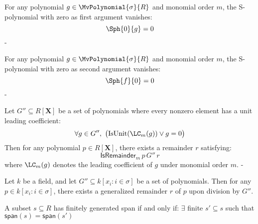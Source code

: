 \begin{lemma}\label{sPolynomial_eq_zero_of_left_eq_zero}
  \leanok
  For any polynomial $g \in \MvPolynomial{\sigma}{R}$ and monomial order $m$,
the S-polynomial with zero as first argument vanishes:
\[
\Sph{0}{g} = 0
\]
-
\end{lemma}

\begin{lemma}\label{sPolynomial_eq_zero_of_right_eq_zero'}
  \leanok
  For any polynomial $g \in \MvPolynomial{\sigma}{R}$ and monomial order $m$,
the S-polynomial with zero as second argument vanishes:
\[
\Sph{f}{0} = 0
\]
-
\end{lemma}

\begin{lemma}\label{div_set'}
  \leanok
  Let $G'' \subseteq R[\mathbf{X}]$ be a set of polynomials where every nonzero element has a unit leading coefficient:
\[
\forall g \in G'',\ \big(\mathrm{IsUnit}(\LC_m(g)) \lor g = 0\big)
\]
Then for any polynomial $p \in R[\mathbf{X}]$, there exists a remainder $r$ satisfying:
\[
\mathsf{IsRemainder}_m\,p\,G''\,r
\]
where $\LC_m(g)$ denotes the leading coefficient of $g$ under monomial order $m$.
-
\end{lemma}

\begin{lemma}\label{div_set''}
  \leanok
  Let \( k \) be a field, and let \( G'' \subseteq k[x_i : i \in \sigma] \) be a set of polynomials.
Then for any \( p \in k[x_i : i \in \sigma] \), there exists a generalized remainder \( r \) of \( p \) upon division by \( G'' \).

\end{lemma}

\begin{lemma}\label{fg_span_iff_fg_span_finset_subset}


  A subset $s \subseteq R$ has finitely generated span if and only if:
$\exists$ finite $s' \subseteq s$ such that $\mathsf{span}(s) = \mathsf{span}(s')$

\end{lemma}

